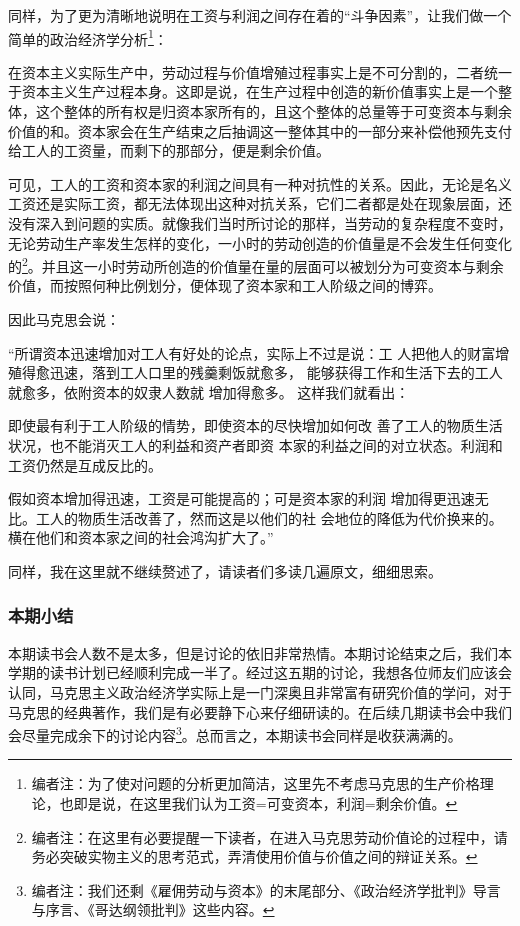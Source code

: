 \documentclass[a4paper,twoside,12pt,AutoFakeBold]{ctexart}
\begin{document}
同样，为了更为清晰地说明在工资与利润之间存在着的“斗争因素”，让我们做一个简单的政治经济学分析\footnote{编者注：为了使对问题的分析更加简洁，这里先不考虑马克思的生产价格理论，也即是说，在这里我们认为工资=可变资本，利润=剩余价值。}：\begin{fangsong}
    在资本主义实际生产中，劳动过程与价值增殖过程事实上是不可分割的，二者统一于资本主义生产过程本身。这即是说，在生产过程中创造的新价值事实上是一个整体，这个整体的所有权是归资本家所有的，且这个整体的总量等于可变资本与剩余价值的和。资本家会在生产结束之后抽调这一整体其中的一部分来补偿他预先支付给工人的工资量，而剩下的那部分，便是剩余价值。
\end{fangsong}

可见，工人的工资和资本家的利润之间具有一种对抗性的关系。因此，无论是名义工资还是实际工资，都无法体现出这种对抗关系，它们二者都是处在现象层面，还没有深入到问题的实质。就像我们当时所讨论的那样，当劳动的复杂程度不变时，无论劳动生产率发生怎样的变化，一小时的劳动创造的价值量是不会发生任何变化的\footnote{编者注：在这里有必要提醒一下读者，在进入马克思劳动价值论的过程中，请务必突破实物主义的思考范式，弄清使用价值与价值之间的辩证关系。}。并且这一小时劳动所创造的价值量在量的层面可以被划分为可变资本与剩余价值，而按照何种比例划分，便体现了资本家和工人阶级之间的博弈。

因此马克思会说：
\begin{adjustwidth}{2em}{2em}
    \qquad\fangsong
    “所谓资本迅速增加对工人有好处的论点，实际上不过是说：工
人把他人的财富增殖得愈迅速，落到工人口里的残羹剩饭就愈多，
能够获得工作和生活下去的工人就愈多，依附资本的奴隶人数就
增加得愈多。
这样我们就看出：

即使最有利于工人阶级的情势，即使资本的尽快增加如何改
善了工人的物质生活状况，也不能消灭工人的利益和资产者即资
本家的利益之间的对立状态。利润和工资仍然是互成反比的。

假如资本增加得迅速，工资是可能提高的；可是资本家的利润
增加得更迅速无比。工人的物质生活改善了，然而这是以他们的社
会地位的降低为代价换来的。横在他们和资本家之间的社会鸿沟扩大了。”
\end{adjustwidth}
同样，我在这里就不继续赘述了，请读者们多读几遍原文，细细思索。
\subsubsection{本期小结}
本期读书会人数不是太多，但是讨论的依旧非常热情。本期讨论结束之后，我们本学期的读书计划已经顺利完成一半了。经过这五期的讨论，我想各位师友们应该会认同，马克思主义政治经济学实际上是一门深奥且非常富有研究价值的学问，对于马克思的经典著作，我们是有必要静下心来仔细研读的。在后续几期读书会中我们会尽量完成余下的讨论内容\footnote{编者注：我们还剩《雇佣劳动与资本》的末尾部分、《政治经济学批判》导言与序言、《哥达纲领批判》这些内容。}。总而言之，本期读书会同样是收获满满的。
\end{document}
